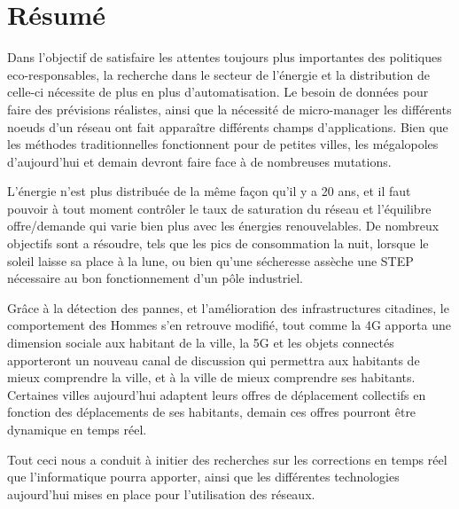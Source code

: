 \chapter*{Résumé}

Dans l'objectif de satisfaire les attentes toujours plus importantes des politiques eco-responsables,
la recherche dans le secteur de l'énergie et la distribution de celle-ci nécessite de plus en plus d'automatisation.
Le besoin de données pour faire des prévisions réalistes, ainsi que la nécessité de micro-manager les différents noeuds
d'un réseau ont fait apparaître différents champs d'applications. Bien que les méthodes traditionnelles fonctionnent
pour de petites villes, les mégalopoles d'aujourd'hui et demain devront faire face à de nombreuses mutations.

L'énergie n'est plus distribuée de la même façon qu'il y a 20 ans, et il faut pouvoir à tout moment contrôler
le taux de saturation du réseau et l'équilibre offre/demande qui varie bien plus avec les énergies renouvelables.
De nombreux objectifs sont a résoudre, tels que les pics de consommation la nuit, lorsque le soleil laisse sa place
à la lune, ou bien qu'une sécheresse assèche une STEP nécessaire au bon fonctionnement d'un pôle industriel.

Grâce à la détection des pannes, et l'amélioration des infrastructures citadines, le comportement des Hommes
s'en retrouve modifié, tout comme la 4G apporta une dimension sociale aux habitant de la ville, la 5G et les objets
connectés apporteront un nouveau canal de discussion qui permettra aux habitants de mieux comprendre la ville, et
à la ville de mieux comprendre ses habitants. Certaines villes aujourd'hui adaptent leurs offres de déplacement
collectifs en fonction des déplacements de ses habitants, demain ces offres pourront être dynamique en temps réel.

Tout ceci nous a conduit à initier des recherches sur les corrections en temps réel que l'informatique pourra
apporter, ainsi que les différentes technologies aujourd'hui mises en place pour l'utilisation des réseaux.